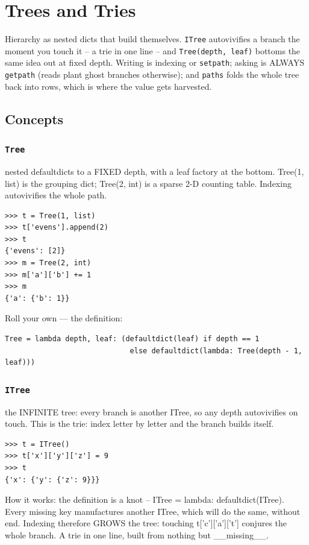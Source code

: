 \documentclass[10pt,letterpaper]{book}
\begin{document}
\clearpage
\chapter{Trees and Tries}

Hierarchy as nested dicts that build themselves. \texttt{ITree} autovivifies
a branch the moment you touch it -- a trie in one line -- and
\texttt{Tree(depth, leaf)} bottoms the same idea out at fixed depth.
Writing is indexing or \texttt{setpath}; asking is ALWAYS \texttt{getpath}
(reads plant ghost branches otherwise); and \texttt{paths} folds the whole
tree back into rows, which is where the value gets harvested.
\section{Concepts}
\subsection{\texttt{Tree}}\label{def:Tree}
nested defaultdicts to a FIXED depth, with a leaf factory at the bottom. Tree(1, list) is the grouping dict; Tree(2, int) is a sparse 2-D counting table. Indexing autovivifies the whole path.
\begin{lstlisting}[style=ex]
>>> t = Tree(1, list)
>>> t['evens'].append(2)
>>> t
{'evens': [2]}
>>> m = Tree(2, int)
>>> m['a']['b'] += 1
>>> m
{'a': {'b': 1}}
\end{lstlisting}

Roll your own --- the definition:

\begin{lstlisting}[style=ex]
Tree = lambda depth, leaf: (defaultdict(leaf) if depth == 1
                             else defaultdict(lambda: Tree(depth - 1, leaf)))
\end{lstlisting}
\subsection{\texttt{ITree}}\label{def:ITree}
the INFINITE tree: every branch is another ITree, so any depth autovivifies on touch. This is the trie: index letter by letter and the branch builds itself.
\begin{lstlisting}[style=ex]
>>> t = ITree()
>>> t['x']['y']['z'] = 9
>>> t
{'x': {'y': {'z': 9}}}
\end{lstlisting}

How it works: the definition is a knot -- ITree = lambda: defaultdict(ITree). Every missing key manufactures another ITree, which will do the same, without end. Indexing therefore GROWS the tree: touching t['c']['a']['t'] conjures the whole branch. A trie in one line, built from nothing but \_\_missing\_\_.
\end{document}
